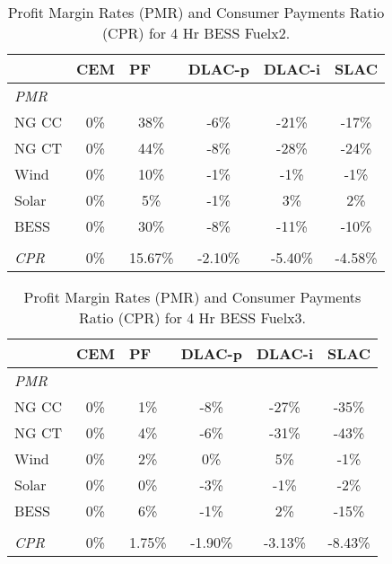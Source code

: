 \documentclass{article}
\begin{document}
\begin{table}[ht]
\centering
\begin{tabular}{lccccc}
\toprule
& \multicolumn{1}{l}{\textbf{CEM}} 
& \multicolumn{1}{l}{\textbf{PF}} 
& \multicolumn{1}{l}{\textbf{DLAC-p}} 
& \multicolumn{1}{l}{\textbf{DLAC-i}} 
& \multicolumn{1}{l}{\textbf{SLAC}} 
 \\ \hline
\midrule
\textit{PMR} & & & & \\
\quad NG CC & 0\% & 38\% & -6\% & -21\% & -17\% \\
\quad NG CT & 0\% & 44\% & -8\% & -28\% & -24\% \\
\quad Wind & 0\% & 10\% & -1\% & -1\% & -1\% \\
\quad Solar & 0\% & 5\% & -1\% & 3\% & 2\% \\
\quad BESS & 0\% & 30\% & -8\% & -11\% & -10\% \\
& & & & \\
\textit{CPR} & 0\% & 15.67\% & -2.10\% & -5.40\% & -4.58\% \\
\bottomrule
\end{tabular}
\caption{Profit Margin Rates (PMR) and Consumer Payments Ratio (CPR) for 4 Hr BESS Fuelx2.}
\label{table:4_Hr_BESS_Fuelx2_pmr}
\end{table}

\begin{table}[ht]
\centering
\begin{tabular}{lccccc}
\toprule
& \multicolumn{1}{l}{\textbf{CEM}} 
& \multicolumn{1}{l}{\textbf{PF}} 
& \multicolumn{1}{l}{\textbf{DLAC-p}} 
& \multicolumn{1}{l}{\textbf{DLAC-i}} 
& \multicolumn{1}{l}{\textbf{SLAC}} 
 \\ \hline
\midrule
\textit{PMR} & & & & \\
\quad NG CC & 0\% & 1\% & -8\% & -27\% & -35\% \\
\quad NG CT & 0\% & 4\% & -6\% & -31\% & -43\% \\
\quad Wind & 0\% & 2\% & 0\% & 5\% & -1\% \\
\quad Solar & 0\% & 0\% & -3\% & -1\% & -2\% \\
\quad BESS & 0\% & 6\% & -1\% & 2\% & -15\% \\
& & & & \\
\textit{CPR} & 0\% & 1.75\% & -1.90\% & -3.13\% & -8.43\% \\
\bottomrule
\end{tabular}
\caption{Profit Margin Rates (PMR) and Consumer Payments Ratio (CPR) for 4 Hr BESS Fuelx3.}
\label{table:4_Hr_BESS_Fuelx3_pmr}
\end{table}
\end{document}
